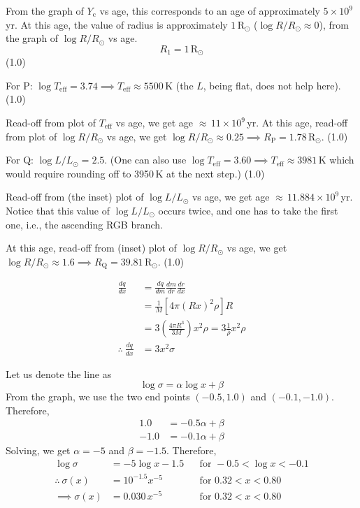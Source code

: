 \begin{description}
  From the graph of $Y_{\mathrm{c}}$ vs age, this corresponds to an age of
  approximately $5 \times 10^{9}$\,yr. At this age, the value of radius is
  approximately $1\,\mathrm{R_\odot}$ ($\log R/R_\odot \approx 0$), from the
  graph of $\log R/R_\odot$ vs age.
  \[
    R_1 = 1\,\mathrm{R_\odot}
  \]
  \hfill(1.0)

\item[(T11.2e)] For P:
  $\log T_{\mathrm{eff}} = 3.74 \implies T_{\mathrm{eff}} \approx 5500$\,K
  (the $L$, being flat, does not help here). \hfill(1.0)

  Read-off from plot of $T_{\mathrm{eff}}$ vs age, we get age
  ${\approx}\,11 \times 10^{9}$\,yr. At this age, read-off from plot of
  $\log R/R_\odot$ vs age, we get $\log R/R_\odot \approx 0.25 \implies
  R_{\mathrm{P}} = 1.78\,\mathrm{R_\odot}$. \hfill(1.0)

  For Q: $\log L/L_\odot = 2.5$. (One can also use
  $\log T_{\mathrm{eff}} = 3.60 \implies T_{\mathrm{eff}} \approx 3981$\,K
  which would require rounding off to 3950\,K at the next step.) \hfill(1.0)

  Read-off from (the inset) plot of $\log L/L_\odot$ vs age, we get age
  ${\approx}\,11.884 \times 10^{9}$\,yr. Notice that this value of
  $\log L/L_\odot$ occurs twice, and one has to take the first one, i.e., the
  ascending RGB branch.

  At this age, read-off from (inset) plot of $\log R/R_\odot$ vs age, we get
  $\log R/R_\odot \approx 1.6 \implies R_{\mathrm{Q}} = 39.81\,\mathrm{R_\odot}$.
  \hfill(1.0)

\item[(T11.3a)]
  \begin{align*}
    \frac{dq}{dx} &= \frac{dq}{dm}\frac{dm}{dr}\frac{dr}{dx}
      \tag*{(0.5)}\\
      &= \frac{1}{M}\left[4\pi (Rx)^2 \rho\right] R\\
      &= 3\left(\frac{4\pi R^3}{3M}\right) x^2 \rho
       = 3 \frac{1}{\bar{\rho}} x^2 \rho
      \tag*{(1.0)}\\
    \therefore\ \frac{dq}{dx} &= 3 x^2 \sigma
      \tag*{(0.5)}
  \end{align*}

\item[(T11.3b)] Let us denote the line as
  \[
    \log\sigma = \alpha \log x + \beta
  \]
  From the graph, we use the two end points $(-0.5, 1.0)$ and $(-0.1, -1.0)$.
  Therefore,
  \begin{align*}
    1.0 &= -0.5\alpha + \beta\\
    -1.0 &= -0.1\alpha + \beta
  \end{align*}
  Solving, we get $\alpha = -5$ and $\beta = -1.5$. Therefore,
  \begin{align*}
    \log\sigma &= -5\log x - 1.5
      &&\text{for } -0.5 < \log x < -0.1
      \tag*{(2.0)}\\
    \therefore\ \sigma(x) &= 10^{-1.5} x^{-5}
      &&\text{for } 0.32 < x < 0.80\\
    \implies \sigma(x) &= 0.030\,x^{-5}
      &&\text{for } 0.32 < x < 0.80
      \tag*{(2.0)}
  \end{align*}


\end{description}
